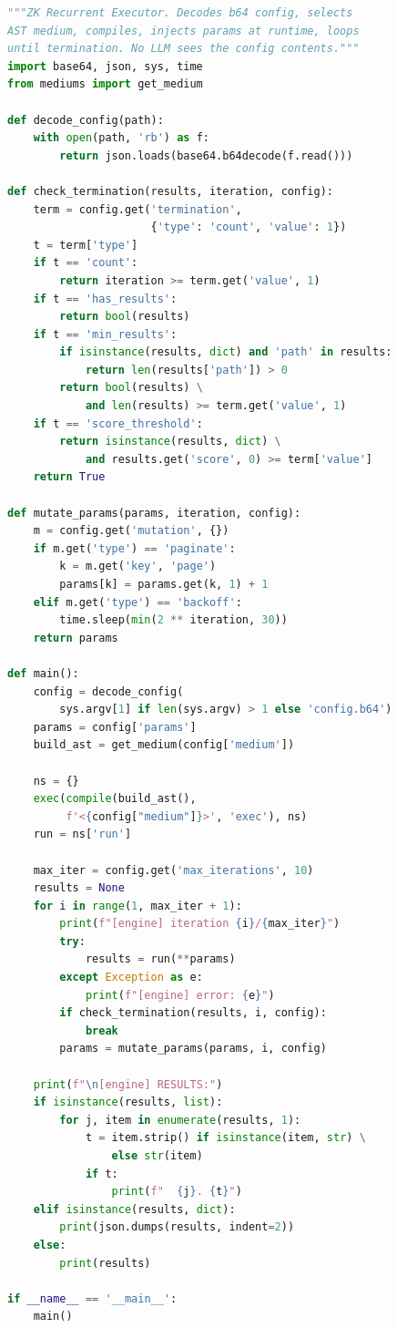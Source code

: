 \documentclass[letterpaper,11pt]{article}
\begin{document}
\begin{lstlisting}[language=Python,caption={engine.py (63 lines)}]
"""ZK Recurrent Executor. Decodes b64 config, selects
AST medium, compiles, injects params at runtime, loops
until termination. No LLM sees the config contents."""
import base64, json, sys, time
from mediums import get_medium

def decode_config(path):
    with open(path, 'rb') as f:
        return json.loads(base64.b64decode(f.read()))

def check_termination(results, iteration, config):
    term = config.get('termination',
                      {'type': 'count', 'value': 1})
    t = term['type']
    if t == 'count':
        return iteration >= term.get('value', 1)
    if t == 'has_results':
        return bool(results)
    if t == 'min_results':
        if isinstance(results, dict) and 'path' in results:
            return len(results['path']) > 0
        return bool(results) \
            and len(results) >= term.get('value', 1)
    if t == 'score_threshold':
        return isinstance(results, dict) \
            and results.get('score', 0) >= term['value']
    return True

def mutate_params(params, iteration, config):
    m = config.get('mutation', {})
    if m.get('type') == 'paginate':
        k = m.get('key', 'page')
        params[k] = params.get(k, 1) + 1
    elif m.get('type') == 'backoff':
        time.sleep(min(2 ** iteration, 30))
    return params

def main():
    config = decode_config(
        sys.argv[1] if len(sys.argv) > 1 else 'config.b64')
    params = config['params']
    build_ast = get_medium(config['medium'])

    ns = {}
    exec(compile(build_ast(),
         f'<{config["medium"]}>', 'exec'), ns)
    run = ns['run']

    max_iter = config.get('max_iterations', 10)
    results = None
    for i in range(1, max_iter + 1):
        print(f"[engine] iteration {i}/{max_iter}")
        try:
            results = run(**params)
        except Exception as e:
            print(f"[engine] error: {e}")
        if check_termination(results, i, config):
            break
        params = mutate_params(params, i, config)

    print(f"\n[engine] RESULTS:")
    if isinstance(results, list):
        for j, item in enumerate(results, 1):
            t = item.strip() if isinstance(item, str) \
                else str(item)
            if t:
                print(f"  {j}. {t}")
    elif isinstance(results, dict):
        print(json.dumps(results, indent=2))
    else:
        print(results)

if __name__ == '__main__':
    main()
\end{lstlisting}
\end{document}
